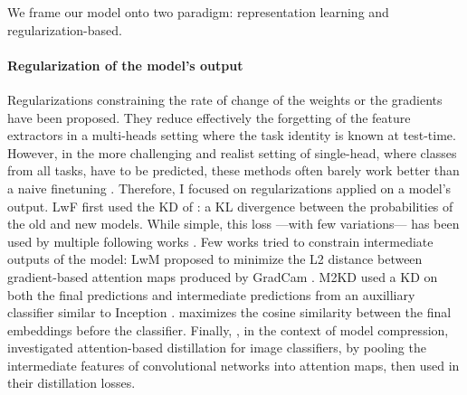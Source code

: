 We frame our model onto two paradigm: representation learning and regularization-based.

\paragraph{Regularization of the model's output} Regularizations constraining the rate of change of
the weights \citep{kirkpatrick2017ewc} or the gradients \citep{farajtabar2020ogd} have been
proposed. They reduce effectively the forgetting of the feature extractors in a multi-heads setting
where the task identity is known at test-time. However, in the more challenging and realist setting
of single-head, where classes from all tasks, have to be predicted, these methods often barely work
better than a naive finetuning \citep{lesort2019regulshortcomings}. Therefore, I focused on
regularizations applied on a model's output. LwF \citep{li2018lwf} first used the \ac{KD} of \cite{hinton2015knowledge_distillation}: a KL divergence between the probabilities
of the old and new models. While simple, this loss ---with few variations--- has been used by
multiple following works \citep{rebuffi2017icarl,zhao2020weightalignement}. Few works tried to
constrain intermediate outputs of the model: LwM \citep{dhar2019learning_without_memorizing_gradcam}
proposed to minimize the L2 distance between gradient-based attention maps produced by GradCam
\citep{selvaraju2017gradcam}. M2KD \citep{peng2019m2kd} used a \ac{KD} on both the final predictions
and intermediate predictions from an auxilliary classifier similar to Inception
\citep{szegedy2015inception}. \cite{hou2019ucir} maximizes the cosine similarity between
the final embeddings before the classifier. Finally,
\cite{zagoruyko2016distillation_attention}, in the context of model compression,
investigated attention-based distillation for image classifiers, by pooling the intermediate
features of convolutional networks into attention maps, then used in their distillation losses.

